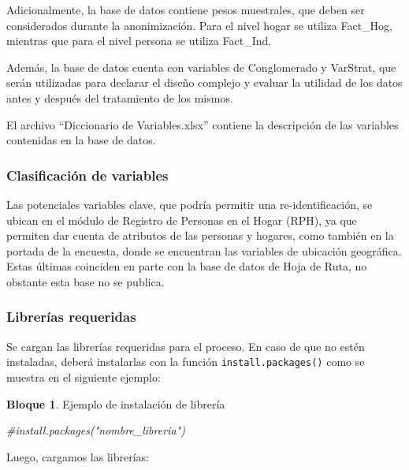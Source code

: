\documentclass[
]{book}
\newenvironment{Shaded}{\begin{snugshade}}{\end{snugshade}}
\newcommand{\CommentTok}[1]{\textcolor[rgb]{0.56,0.35,0.01}{\textit{#1}}}
\theoremstyle{definition}
\theoremstyle{definition}
\newtheorem{example}{Bloque}[chapter]
\theoremstyle{definition}
\theoremstyle{definition}
\theoremstyle{remark}
\begin{document}
Adicionalmente, la base de datos contiene pesos muestrales, que deben ser considerados durante la anonimización. Para el nivel hogar se utiliza Fact\_Hog, mientras que para el nivel persona se utiliza Fact\_Ind.

Además, la base de datos cuenta con variables de Conglomerado y VarStrat, que serán utilizadas para declarar el diseño complejo y evaluar la utilidad de los datos antes y después del tratamiento de los mismos.

El archivo ``Diccionario de Variables.xlsx'' contiene la descripción de las variables contenidas en la base de datos.

\hypertarget{clasificaciuxf3n-de-variables-1}{%
\subsubsection{Clasificación de variables}\label{clasificaciuxf3n-de-variables-1}}

Las potenciales variables clave, que podría permitir una re-identificación, se ubican en el módulo de Registro de Personas en el Hogar (RPH), ya que permiten dar cuenta de atributos de las personas y hogares, como también en la portada de la encuesta, donde se encuentran las variables de ubicación geográfica. Estas últimas coinciden en parte con la base de datos de Hoja de Ruta, no obstante esta base no se publica.

\hypertarget{libreruxedas-requeridas}{%
\subsubsection{Librerías requeridas}\label{libreruxedas-requeridas}}

Se cargan las librerías requeridas para el proceso. En caso de que no estén instaladas, deberá instalarlas con la función \texttt{install.packages()} como se muestra en el siguiente ejemplo:

\begin{example}
\protect\hypertarget{exm:bloque4nbm}{}\label{exm:bloque4nbm}Ejemplo de instalación de librería
\end{example}

\begin{Shaded}
\begin{Highlighting}[]
\CommentTok{\#install.packages("nombre\_libreria") }
\end{Highlighting}
\end{Shaded}

Luego, cargamos las librerías:
\end{document}
